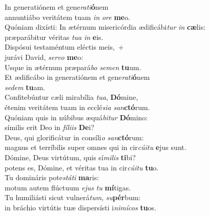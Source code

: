\evenverse In generatiónem et gene\textit{ra}\textit{ti}\textbf{ó}nem~\*\\
\evenverse annuntiábo veritátem tuam \textit{in} \textit{o}\textit{re} \textbf{me}o.\\
\oddverse Quóniam dixísti: In ætérnum misericórdia ædificábi\textit{tur} \textit{in} \textbf{cæ}lis:~\*\\
\oddverse præparábitur véritas \textit{tu}\textit{a} \textit{in} \textbf{e}is.\\
\evenverse Dispósui testaméntum eléctis meis,~+\\
\evenverse  jurávi David, \textit{ser}\textit{vo} \textbf{me}o:~\*\\
\evenverse Usque in ætérnum præpará\textit{bo} \textit{se}\textit{men} \textbf{tu}um.\\
\oddverse Et ædificábo in generatiónem et gene\textit{ra}\textit{ti}\textbf{ó}nem~\*\\
\oddverse \textit{se}\textit{dem} \textbf{tu}am.\\
\evenverse Confitebúntur cæli mirabília \textit{tu}\textit{a}, \textbf{Dó}mine,~\*\\
\evenverse étenim veritátem tuam in ecclé\textit{si}\textit{a} \textit{san}\textbf{ctó}rum.\\
\oddverse Quóniam quis in núbibus æquá\textit{bi}\textit{tur} \textbf{Dó}mino:~\*\\
\oddverse símilis erit Deo in \textit{fí}\textit{li}\textit{is} \textbf{De}i?\\
\evenverse Deus, qui glorificátur in consíli\textit{o} \textit{san}\textbf{ctó}rum:~\*\\
\evenverse magnus et terríbilis super omnes qui in cir\textit{cú}\textit{i}\textit{tu} \textbf{e}jus sunt.\\
\oddverse Dómine, Deus virtútum, quis sí\textit{mi}\textit{lis} \textbf{ti}bi?~\*\\
\oddverse potens es, Dómine, et véritas tua in cir\textit{cú}\textit{i}\textit{tu} \textbf{tu}o.\\
\evenverse Tu domináris pote\textit{stá}\textit{ti} \textbf{ma}ris:~\*\\
\evenverse motum autem flúctuum \textit{e}\textit{jus} \textit{tu} \textbf{mí}tigas.\\
\oddverse Tu humiliásti sicut vulnerá\textit{tum}, \textit{su}\textbf{pér}bum:~\*\\
\oddverse in bráchio virtútis tuæ dispersísti i\textit{ni}\textit{mí}\textit{cos} \textbf{tu}os.\\
